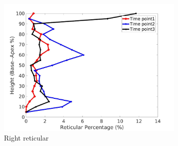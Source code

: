 \begin{figure}[H]
\begin{subfigure}{.42\linewidth}
  \includegraphics[width=\linewidth,trim={{.0\wd0} {.0\wd0} {.0\wd0} {.0\wd0}},clip]{Appendix/Image_AppexA/BaseToApex/IPF2RightLungReticularDiseaseAgainstHeight.jpg}
  \caption{Right reticular}
  \label{fig:IPF2DiseaseAgainstHeight-d}
\end{subfigure}
\begin{subfigure}{.42\linewidth}%

\end{subfigure}
\end{figure}
